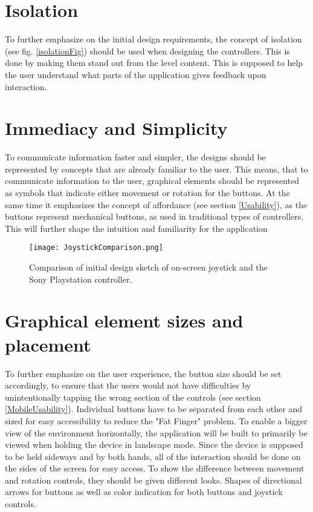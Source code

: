 \section{Isolation}
To further emphasize on the initial design requirements, the concept of isolation (see fig. \ref{isolationFig}) should be used when designing the controllers. This is done by making them stand out from the level content. This is supposed to help the user understand what parts of the application gives feedback upon interaction.

\section{Immediacy and Simplicity}
To communicate information faster and simpler, the designs should be represented by concepts that are already familiar to the user. This means, that to communicate information to the user, graphical elements should be represented as symbols that indicate either movement or rotation for the buttons. At the same time it emphasizes the concept of affordance (see section \ref{Usability}), as the buttons represent mechanical buttons, as used in traditional types of controllers. This will further shape the intuition and familiarity for the application

\begin{figure}[H]
\centering
\texttt{[image: JoystickComparison.png]}
\caption{Comparison of initial design sketch of on-screen joystick and the Sony Playstation controller.}
\end{figure}

\section{Graphical element sizes and placement}
To further emphasize on the user experience, the button size should be set accordingly, to ensure that the users would not have difficulties by unintentionally tapping the wrong section of the controls (see section \ref{MobileUsability}). Individual buttons have to be separated from each other and sized for easy accessibility to reduce the "Fat Finger" problem. To enable a bigger view of the environment horizontally, the application will be built to primarily be viewed when holding the device in landscape mode. Since the device is supposed to be held sideways and by both hands, all of the interaction should be done on the sides of the screen for easy access.
To show the difference between movement and rotation controls, they should be given different looks. Shapes of directional arrows for buttons as well as color indication for both buttons and joystick controls.

